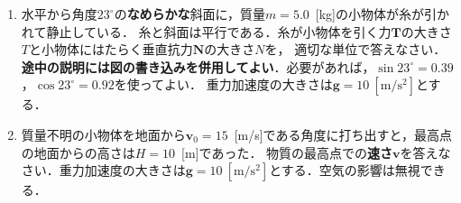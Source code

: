 \documentclass[a4paper,11pt]{ltjsarticle}
\begin{document}
\begin{enumerate}[label={\LARGE \Roman*}]
\begin{enumerate}[label=(\arabic*)]

        時刻$t=0$には，ボールは位置$(0,h)$におり，かつ，速度が$(\bm{v}_0,0)$だったので，初期条件は次である．

\clearpage

        \item 問1の方程式と条件を解いて，空中に飛んでいるボールの\textbf{運動}，つまり，函数$x(t)$と$y(t)$を答えなさい．
        

        \item 打ち出してから$2.0$\ [s]後のボールの\textbf{位置}と\textbf{速度}を答えなさい．


        \item 問題のボールが地面に衝突する\textbf{時刻}と\textbf{位置}を答えなさい．
        
    \end{enumerate}

\clearpage

    \item 水平から角度$23^\circ$の\textbf{なめらかな}斜面に，質量$m=5.0$\ [kg]の小物体が糸が引かれて静止している．
    糸と斜面は平行である．糸が小物体を引く力$\bm{T}$の大きさ$T$と小物体にはたらく垂直抗力$\bm{N}$の大きさ$N$を，
    適切な単位で答えなさい．\textbf{途中の説明には図の書き込みを併用してよい}．必要があれば，$\sin 23^\circ = 0.39$，$\cos 23^\circ = 0.92$を使ってよい．
    重力加速度の大きさは$\bm{g}=10\ [\mathrm{m/s^2}]$とする．


    \begin{center}
    \end{center}


    \item 質量不明の小物体を地面から$\bm{v}_0=15$\ [m/s]である角度に打ち出すと，最高点の地面からの高さは$H=10$\ [m]であった．
    物質の最高点での\textbf{速さ}$\bm{v}$を答えなさい．重力加速度の大きさは$\bm{g}=10\ [\mathrm{m/s^2}]$とする．空気の影響は無視できる．


\end{enumerate}
\end{document}
